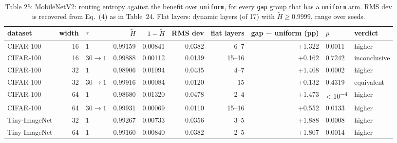 \documentclass{article}
\begin{document}
\begin{table}
\caption{Table 25: MobileNetV2: routing entropy against the benefit over
\texttt{uniform}, for every \texttt{gap} group that has a \texttt{uniform}
arm. RMS dev is recovered from Eq.~(4) as in
Table~24. Flat layers: dynamic layers (of 17)
with $\tilde H\ge0.9999$, range over seeds.}

\begin{tabular}{l r l rrr r rll}
\toprule
dataset & width & $\tau$ & $\tilde H$ & $1-\tilde H$ & RMS dev & flat layers & gap − uniform (pp) & $p$ & verdict \\
\midrule
CIFAR‑100 & 16 & $1$ & 0.99159 & 0.00841 & 0.0382 & 6--7 & +1.322 & 0.0011 & higher \\
CIFAR‑100 & 16 & $30\!\to\!1$ & 0.99888 & 0.00112 & 0.0139 & 15--16 & +0.162 & 0.7242 & inconclusive \\
CIFAR‑100 & 32 & $1$ & 0.98906 & 0.01094 & 0.0435 & 4--7 & +1.408 & 0.0002 & higher \\
CIFAR‑100 & 32 & $30\!\to\!1$ & 0.99916 & 0.00084 & 0.0120 & 15 & +0.132 & 0.4319 & equivalent \\
CIFAR‑100 & 64 & $1$ & 0.98680 & 0.01320 & 0.0478 & 2--4 & +1.473 & < 10\textsuperscript{−4} & higher \\
CIFAR‑100 & 64 & $30\!\to\!1$ & 0.99931 & 0.00069 & 0.0110 & 15--16 & +0.552 & 0.0133 & higher \\
Tiny‑ImageNet & 32 & $1$ & 0.99267 & 0.00733 & 0.0356 & 3--5 & +1.888 & 0.0008 & higher \\
Tiny‑ImageNet & 64 & $1$ & 0.99160 & 0.00840 & 0.0382 & 2--5 & +1.807 & 0.0014 & higher \\
\bottomrule
\end{tabular}
\end{table}
\end{document}
